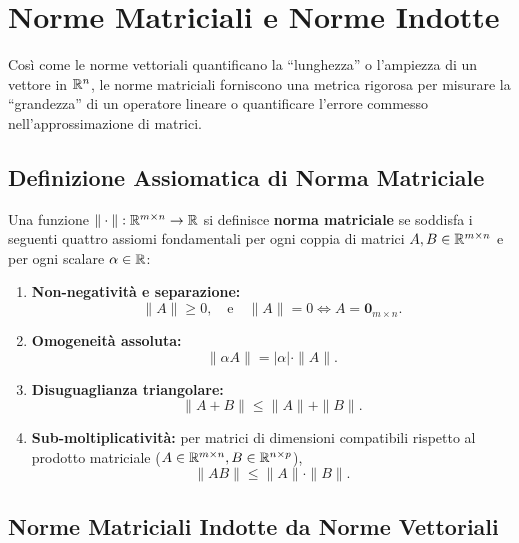 \FloatBarrier
\section{Norme Matriciali e Norme Indotte}
\label{sec:norme-matriciali-indotte}

Cos\`i come le norme vettoriali quantificano la ``lunghezza'' o l'ampiezza di un vettore in $\mathbb{R}^n$, le norme matriciali forniscono una metrica rigorosa per misurare la ``grandezza'' di un operatore lineare o quantificare l'errore commesso nell'approssimazione di matrici.

\subsection{Definizione Assiomatica di Norma Matriciale}

\begin{definition}
Una funzione $\|\cdot\|: \mathbb{R}^{m \times n} \to \mathbb{R}$ si definisce \textbf{norma matriciale} se soddisfa i seguenti quattro assiomi fondamentali per ogni coppia di matrici $A, B \in \mathbb{R}^{m \times n}$ e per ogni scalare $\alpha \in \mathbb{R}$:
\begin{enumerate}
    \item \textbf{Non-negativit\`a e separazione:}
    \begin{equation}
        \|A\| \ge 0, \quad \text{e} \quad \|A\| = 0 \iff A = \mathbf{0}_{m \times n}.
    \end{equation}
    \item \textbf{Omogeneit\`a assoluta:}
    \begin{equation}
        \|\alpha A\| = |\alpha| \cdot \|A\|.
    \end{equation}
    \item \textbf{Disuguaglianza triangolare:}
    \begin{equation}
        \|A + B\| \le \|A\| + \|B\|.
    \end{equation}
    \item \textbf{Sub-moltiplicativit\`a:} per matrici di dimensioni compatibili rispetto al prodotto matriciale ($A \in \mathbb{R}^{m \times n}, B \in \mathbb{R}^{n \times p}$),
    \begin{equation}
        \|AB\| \le \|A\| \cdot \|B\|.
    \end{equation}
\end{enumerate}
\end{definition}

\subsection{Norme Matriciali Indotte da Norme Vettoriali}

